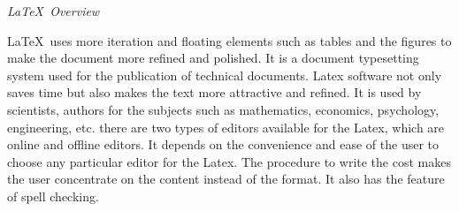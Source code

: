\documentclass[a4paper]{article}
\begin{document}
  
\begin{center}  
\begin{huge}  
\textit{\LaTeX\ Overview}\\  
\end{huge}  
  
\end{center}  
  
\LaTeX\ uses more iteration and floating elements such as tables and the figures to make the document more refined and polished.%
It is a document typesetting system used for the publication of technical documents. Latex software not only saves time but also makes the text more attractive and refined. It is used by scientists, authors for the subjects such as mathematics, economics, psychology, engineering, etc. there are two types of editors available for the Latex, which are online and offline editors. It depends on the convenience and ease of the user to choose any particular editor for the Latex. The procedure to write the cost makes the user concentrate on the content instead of the format. It also has the feature of spell checking.  
\end{document}
